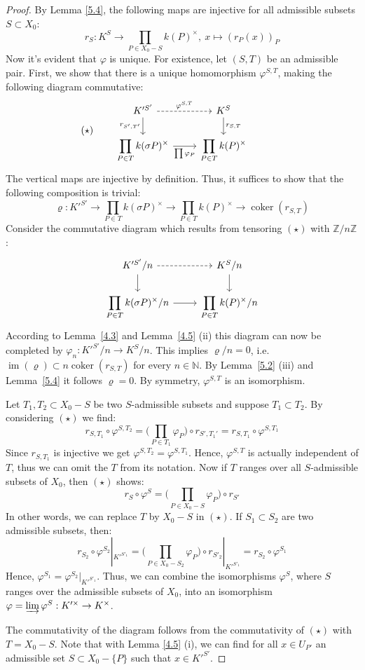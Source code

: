 \begin{proof}
By Lemma \ref{5.4}, the following maps are injective for all admissible subsets $S\subset X_0$:
\[ r_S:K^S \to\prod_{P\in X_0 -  S} k(P)^\times,\ x\mapsto (r_P(x))_P \]
Now it's evident that $\varphi$ is unique. For existence, let $(S,T)$ be an admissible pair. First, we show that there is a unique homomorphism $\varphi^{S,T}$, making the following diagram commutative:
\[ (\star) \qquad \begin{tikzcd}
K'^{S'} \rar["\varphi^{S,T}", dashed] \dar["r_{S',T'}"'] & K^S \dar["r_{S,T}"]\\
\displaystyle \prod_{P\in T}k(\sigma P)^\times \rar["\prod\varphi_P"'] & \displaystyle \prod_{P\in T}k(P)^\times
\end{tikzcd} \phantom{\qquad (\star)} \]
The vertical maps are injective by definition. Thus, it suffices to show that the following composition is trivial:
\[\varrho:K'^{S'}\longrightarrow\prod_{P\in T} k(\sigma P)^\times \longrightarrow \prod_{P\in T} k(P)^\times\longrightarrow\operatorname{coker}(r_{S,T})\] 
Consider the commutative diagram which results from tensoring $(\star)$ with $\mathbb{Z}/n\mathbb{Z}$:
\[ \begin{tikzcd}
K'^{S'}/n \rar[dashed]\dar & K^S/n\dar\\
\displaystyle \prod_{P\in T}k(\sigma P)^\times/n \rar & \displaystyle \prod_{P\in T}k(P)^\times/n
\end{tikzcd} \]
According to Lemma~\ref{4.3} and Lemma~\ref{4.5} (ii) this diagram can now be completed by $\varphi_n: K'^{S'}/n\to K^S/n$. This implies $\varrho/n=0$, i.e. $\operatorname{im}(\varrho)\subset n\operatorname{coker}(r_{S,T})$ for every $n\in\mathbb{N}$. By Lemma~\ref{5.2} (iii) and Lemma~\ref{5.4} it follows $\varrho = 0$. By symmetry, $\varphi^{S,T}$ is an isomorphism.

Let $T_1, T_2\subset X_0 -  S$ be two $S$-admissible subsets and suppose $T_1\subset T_2$. By considering $(\star)$ we find:
\[ r_{S,T_1}\circ\varphi^{S,T_2}=\Big(\prod_{P\in T_1}\varphi_P\Big)\circ r_{S',T_1'} = r_{S,T_1}\circ\varphi^{S,T_1} \]
Since $r_{S,T_1}$ is injective we get $\varphi^{S,T_2}=\varphi^{S,T_1}$. Hence, $\varphi^{S,T}$ is actually independent of $T$, thus we can omit the $T$ from its notation. Now if $T$ ranges over all $S$-admissible subsets of $X_0$, then $(\star)$ shows:
\[ r_S\circ\varphi^S = \Big(\prod_{P\in X_0 -  S}\varphi_P \Big)\circ r_{S'} \]
In other words, we can replace $T$ by $X_0 -  S$ in $(\star)$. If $S_1\subset S_2$ are two admissible subsets, then:
\[ r_{S_2}\circ\varphi^{S_2}|_{K'^{S'_1}} = \Big(\prod_{P\in X_0 -  S_2}\varphi_P \Big)\circ r_{S'_2}|_{K'^{S'_1}} = r_{S_2}\circ\varphi^{S_1} \]
Hence, $\varphi^{S_1}=\varphi^{S_2}|_{K'^{S'_1}}$. Thus, we can combine the isomorphisms $\varphi^S$, where $S$ ranges over the admissible subsets of $X_0$, into an isomorphism $\varphi = \varinjlim \varphi^S: K'^\times \to K^\times$. 

The commutativity of the diagram follows from the commutativity of $(\star)$ with $T=X_0 -  S$. Note that with Lemma \ref{4.5} (i), we can find for all $x\in U_{P'}$ an admissible set $S\subset X_0 -  \{P\}$ such that $x\in K'^{S'}$.
\end{proof}

